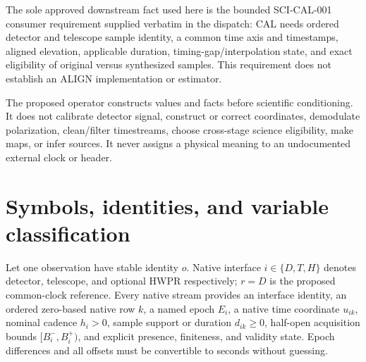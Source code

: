 \documentclass[11pt]{article}
\begin{document}
The sole approved downstream fact used here is the bounded SCI-CAL-001
consumer requirement supplied verbatim in the dispatch: CAL needs ordered
detector and telescope sample identity, a common time axis and timestamps,
aligned elevation, applicable duration, timing-gap/interpolation state, and
exact eligibility of original versus synthesized samples.  This requirement
does not establish an ALIGN implementation or estimator.

The proposed operator constructs values and facts before scientific
conditioning.  It does not calibrate detector signal, construct or correct
coordinates, demodulate polarization, clean/filter timestreams, choose
cross-stage science eligibility, make maps, or infer sources.  It never
assigns a physical meaning to an undocumented external clock or header.

\section{Symbols, identities, and variable classification}

Let one observation have stable identity \(o\).  Native interface
\(i\in\{D,T,H\}\) denotes detector, telescope, and optional HWPR respectively;
\(r=D\) is the proposed common-clock reference.  Every native stream provides
an interface identity, an ordered zero-based native row \(k\), a named epoch
\(E_i\), a native time coordinate \(u_{ik}\), nominal cadence \(h_i>0\),
sample support or duration \(d_{ik}\geq0\), half-open acquisition bounds
\([B_i^-,B_i^+)\), and explicit presence, finiteness, and validity state.
Epoch differences and all offsets must be convertible to seconds without
guessing.
\end{document}
